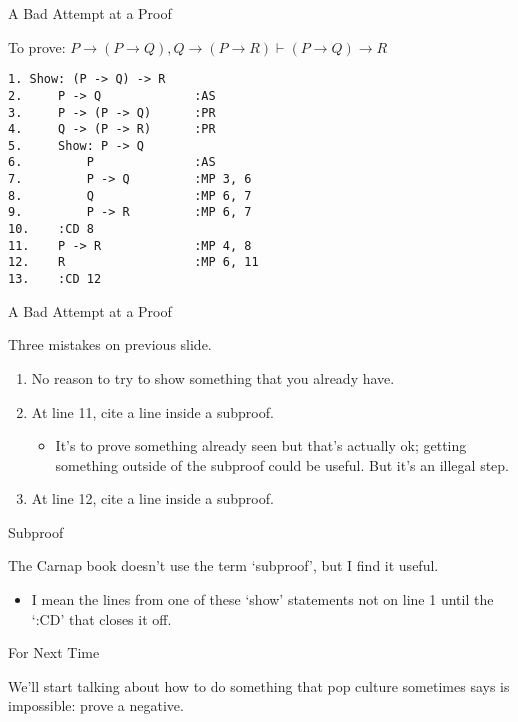 \documentclass[
  ignorenonframetext,
]{beamer}
\providecommand{\tightlist}{%
  \setlength{\itemsep}{0pt}\setlength{\parskip}{0pt}}
\renewcommand{\,}{\text{, }}
\begin{document}
\begin{frame}[fragile]{A Bad Attempt at a Proof}
\protect\hypertarget{a-bad-attempt-at-a-proof}{}

To prove:
\(P \rightarrow (P \rightarrow Q), Q \rightarrow (P \rightarrow R) \vdash (P \rightarrow Q) \rightarrow R\)

\begin{verbatim}
1. Show: (P -> Q) -> R
2.     P -> Q             :AS
3.     P -> (P -> Q)      :PR
4.     Q -> (P -> R)      :PR
5.     Show: P -> Q
6.         P              :AS
7.         P -> Q         :MP 3, 6
8.         Q              :MP 6, 7
9.         P -> R         :MP 6, 7
10.    :CD 8
11.    P -> R             :MP 4, 8
12.    R                  :MP 6, 11
13.    :CD 12
\end{verbatim}

\end{frame}

\begin{frame}{A Bad Attempt at a Proof}
\protect\hypertarget{a-bad-attempt-at-a-proof-1}{}

Three mistakes on previous slide.

\begin{enumerate}
\tightlist
\item
  No reason to try to show something that you already have.
\item
  At line 11, cite a line inside a subproof.

  \begin{itemize}
  \tightlist
  \item
    It's to prove something already seen but that's actually ok; getting
    something outside of the subproof could be useful. But it's an
    illegal step.
  \end{itemize}
\item
  At line 12, cite a line inside a subproof.
\end{enumerate}

\end{frame}

\begin{frame}{Subproof}
\protect\hypertarget{subproof}{}

The Carnap book doesn't use the term `subproof', but I find it useful.

\begin{itemize}
\tightlist
\item
  I mean the lines from one of these `show' statements not on line 1
  until the `:CD' that closes it off.
\end{itemize}

\end{frame}

\begin{frame}{For Next Time}
\protect\hypertarget{for-next-time}{}

We'll start talking about how to do something that pop culture sometimes
says is impossible: prove a negative.

\end{frame}
\end{document}
